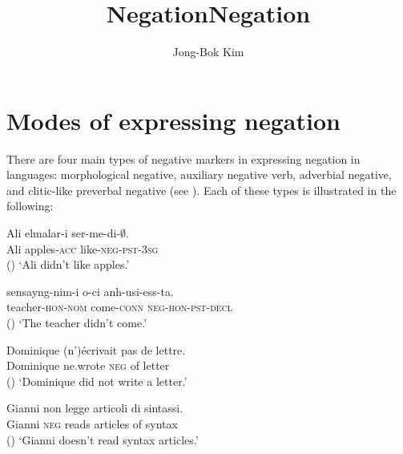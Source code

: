 \documentclass[output=paper
                ,modfonts
                ,nonflat
	        ,collection
	        ,collectionchapter
	        ,collectiontoclongg
 	        ,biblatex
                ,babelshorthands
                ,newtxmath
                ,draftmode
                ,colorlinks, citecolor=brown
]{./langsci/langscibook}
\author{Jong-Bok Kim\affiliation{Kyung Hee University, Seoul}}
\title{Negation}
\title{Negation}
\begin{document}
\maketitle
\label{chap-negation}

{


\section{Modes of expressing negation}


There are four main types of negative markers
in expressing negation in languages: morphological negative,
auxiliary negative verb, adverbial negative, and clitic-like
 preverbal negative (see \citealt{Dahl:79, Payne:85, Zanuttini:2001, Dryer:05}).
Each of these types is illustrated in the following:

\eal
\ex\label{negation-1a}
\gll Ali  elmalar-i  ser-me-di-$\emptyset$. \\
Ali apples-\textsc{acc}  like-\textsc{neg}-\textsc{pst}-\textsc{3sg} \\ \hfill ()
\glt `Ali didn't like apples.'

\ex\label{negation-1b}
\gll sensayng-nim-i o-ci anh-usi-ess-ta. \\
teacher-\textsc{hon}-\textsc{nom} come-\textsc{conn} \textsc{neg}-\textsc{hon}-\textsc{pst}-\textsc{decl} \\  \hfill ()
\glt `The teacher didn't come.'

\ex \label{negation-1c}
\gll Dominique (n')\'{e}crivait pas de lettre.\\
     Dominique ne.wrote \textsc{neg} of letter \\ \hfill ()
\glt `Dominique did not write a letter.'

\ex \label{negation-1d}
\gll Gianni non legge articoli di sintassi. \\
Gianni \textsc{neg} reads articles of syntax \\ \hfill ()
\glt `Gianni doesn't read syntax articles.'
\zl

}
\end{document}
